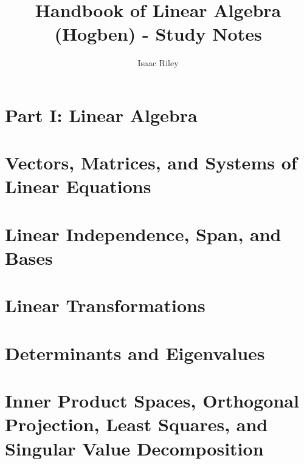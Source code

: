 \documentclass[a4paper]{article}
\title{Handbook of Linear Algebra (Hogben) - Study Notes}
\author{Isaac Riley}
\begin{document}
\maketitle
\tableofcontents
\newpage

\section*{Part I: Linear Algebra}

\section{Vectors, Matrices, and Systems of Linear Equations}

\subsection{}

\subsubsection{}


\section{Linear Independence, Span, and Bases}

\section{Linear Transformations}

\section{Determinants and Eigenvalues}

\section{Inner Product Spaces, Orthogonal Projection, 
Least Squares, and Singular Value Decomposition}
\end{document}
